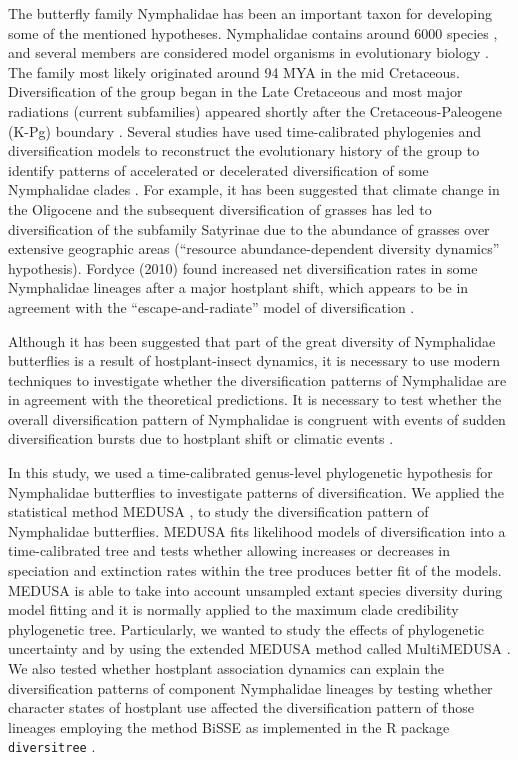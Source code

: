 \documentclass[10pt]{article}
\begin{document}
The butterfly family Nymphalidae has been an important taxon for
developing some of the mentioned hypotheses. Nymphalidae contains around
6000 species \cite{van_nieukerken2011},
and several members are considered model organisms
in evolutionary biology \cite{joron2006,willmott2006,brakefield2009}.
The family most likely originated
around 94 MYA in the mid Cretaceous. Diversification of the group began
in the Late Cretaceous and most major radiations (current subfamilies)
appeared shortly after the Cretaceous-Paleogene (K-Pg) boundary
\cite{heikkila2012}. Several studies have used time-calibrated phylogenies and
diversification models to reconstruct the evolutionary history of the
group to identify patterns of accelerated or decelerated diversification
of some Nymphalidae clades
\cite{heikkila2012,elias2009,fordyce2010,wahlberg2009}.
For example, it has been
suggested that climate change in the Oligocene and the subsequent
diversification of grasses has led to diversification of the subfamily
Satyrinae \cite{pena2008} due to the abundance of grasses over extensive
geographic areas (``resource abundance-dependent diversity dynamics''
hypothesis). Fordyce (2010) \cite{fordyce2010} found increased net diversification
rates in some Nymphalidae lineages after a major hostplant shift, which
appears to be in agreement with the ``escape-and-radiate'' model of
diversification \cite{ehrlich1964}.

Although it has been suggested that part of the great diversity of
Nymphalidae butterflies is a result of hostplant-insect dynamics, it is
necessary to use modern techniques to investigate whether the
diversification patterns of Nymphalidae are in agreement with the
theoretical predictions. It is necessary to test whether the overall
diversification pattern of Nymphalidae is congruent with events of
sudden diversification bursts due to hostplant shift or climatic events
\cite{nylin2014,ferrer2013}.

In this study, we used a time-calibrated genus-level phylogenetic
hypothesis for Nymphalidae butterflies \cite{wahlberg2009} to
investigate patterns
of diversification. We applied the statistical method
MEDUSA \cite{alfaro2009,harmon2011},
to study the diversification pattern of Nymphalidae
butterflies. MEDUSA fits likelihood models of diversification into a
time-calibrated tree and tests whether allowing increases or decreases
in speciation and extinction rates within the tree produces better fit
of the models. MEDUSA is able to take into account unsampled extant
species diversity during model fitting and it is normally applied to the
maximum clade credibility phylogenetic tree. Particularly, we wanted to
study the effects of phylogenetic uncertainty and by using the extended
MEDUSA method called MultiMEDUSA \cite{alfaro2009}. We also tested whether
hostplant association dynamics can explain the diversification patterns
of component Nymphalidae lineages by testing whether character states of
hostplant use affected the diversification pattern of those lineages
employing the method BiSSE as implemented in the R package
\texttt{diversitree} \cite{fitzjohn2012}.
\end{document}
